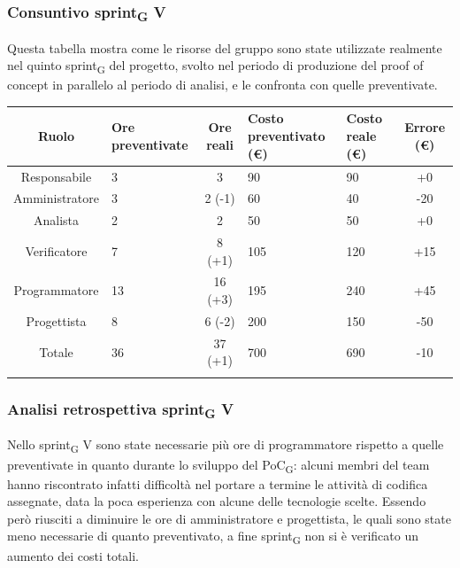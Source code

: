 
\newpage
\subsubsection{Consuntivo sprint\textsubscript{G} V}
Questa tabella mostra come le risorse del gruppo sono state utilizzate realmente nel quinto sprint\textsubscript{G} del progetto, svolto nel periodo di produzione del proof of concept in parallelo al periodo di analisi, e le confronta con quelle preventivate.

\setlength\extrarowheight{5pt}
\begin{tabularx}{\textwidth}{|c|XcXX|c|}
	\hline
	\rowcolor{white}
	\textbf{Ruolo} & \textbf{Ore preventivate} & \textbf{Ore reali} & \textbf{Costo preventivato (€)} & \textbf{Costo reale (€)} & \textbf{Errore (€)} \\
	\hline
	Responsabile &3&3&90&90&+0\\
	Amministratore &3&2 (-1)&60&40&-20\\
	Analista &2&2&50&50&+0\\
	Verificatore &7&8 (+1)&105&120&+15\\
	Programmatore &13&16 (+3)&195&240&+45\\
	Progettista &8&6 (-2)&200&150&-50 \\
	\hline
	Totale &36&37 (+1)&700&690&-10\\
	\hline
	\rowcolor{white}
	\caption{Consuntivo ore e costi per ruolo del quinto sprint\textsubscript{G}}
\end{tabularx}
\subsubsection{Analisi retrospettiva sprint\textsubscript{G} V}
Nello sprint\textsubscript{G} V sono state necessarie più ore di programmatore rispetto a quelle preventivate in quanto durante lo sviluppo del PoC\textsubscript{G}: alcuni membri del team hanno riscontrato infatti difficoltà nel portare a termine le attività di codifica assegnate, data la poca esperienza con alcune delle tecnologie scelte. Essendo però riusciti a diminuire le ore di amministratore e progettista, le quali sono state meno necessarie di quanto preventivato, a fine sprint\textsubscript{G} non si è verificato un aumento dei costi totali.
\newpage

